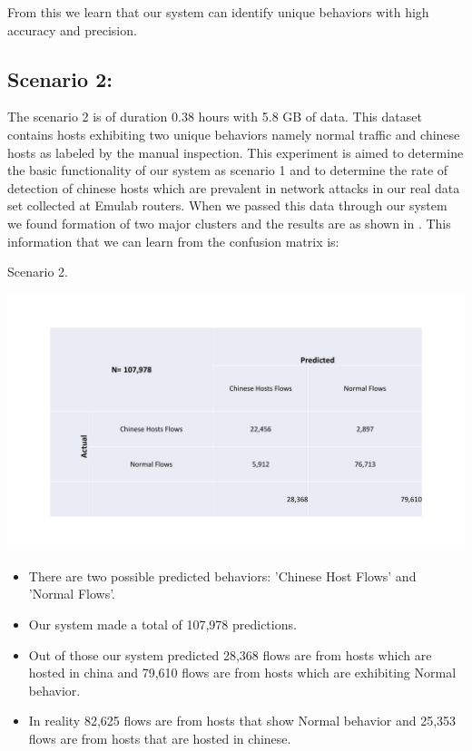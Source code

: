 From this we learn that our system can identify unique behaviors with high accuracy and precision.

\subsection{Scenario 2:}
The scenario 2 is of duration 0.38 hours with 5.8 GB of data. This dataset contains hosts exhibiting two unique behaviors namely normal traffic and chinese hosts as labeled by the manual inspection. This experiment is aimed to determine the basic functionality of our system as scenario 1 and to determine the rate of detection of chinese hosts which are prevalent in network attacks in our real data set collected at Emulab routers. When we passed this data through our system we found formation of two major clusters and the results are as shown in  . This information that we can learn from the confusion matrix is:

\begin{table}[b]
	\caption{Scenario 2.}%
	\centerline{\includegraphics[scale = 0.5]{scenario2.pdf}}	
\end{table}

\begin{itemize}
	\item There are two possible predicted behaviors: 'Chinese Host Flows' and 'Normal Flows'. 
	\item Our system made a total of 107,978 predictions.
	\item Out of those our system predicted 28,368 flows are from hosts which are hosted in china and 79,610 flows are from hosts which are exhibiting Normal behavior.
	\item In reality 82,625 flows are from hosts that show Normal behavior and 25,353 flows are from hosts that are hosted in chinese.	
\end{itemize}

